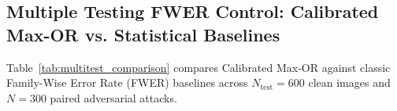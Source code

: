 \documentclass[preprint,12pt]{elsarticle}
\begin{document}
\subsection{Multiple Testing FWER Control: Calibrated Max-OR vs. Statistical Baselines}
\label{sec:multitest_baselines}
Table~\ref{tab:multitest_comparison} compares Calibrated Max-OR against classic Family-Wise Error Rate (FWER) baselines across $N_{\mathrm{test}} = 600$ clean images and $N=300$ paired adversarial attacks.

\begin{table}[!htbp]
\centering
\caption{Exact audited comparison of multiple testing correction paradigms across $M=4$ monitoring channels ($N_{\mathrm{cal}}=1200$, $N_{\mathrm{test}}=600$, $N_{\mathrm{attacks}}=300$ paired samples, 95\% Clopper-Pearson exact binomial CI).}
\label{tab:multitest_comparison}
\renewcommand{\arraystretch}{1.40}
\end{table}
\end{document}

